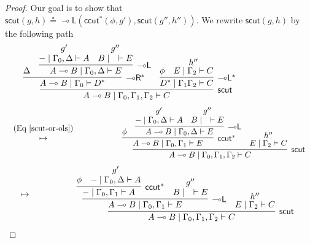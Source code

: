 \documentclass[sn-mathphys-num]{sn-jnl}%
\newcommand{\GG}{\Gamma}
\newcommand{\GD}{\Delta}
\newcommand{\vd}{\vdash}
\newcommand{\lolli}{\multimap}
\newcommand{\lleft}{{\lolli}\mathsf{L}}
\newcommand{\lright}{{\lolli}\mathsf{R}}
\newcommand{\mf}[1]{\mathsf{#1}}
\newcommand{\scut}[2]{\mf{scut} (#1 , #2)}
\newcommand{\iccut}[2]{\mf{ccut}^* (#1 , #2)}
\theoremstyle{thmstyleone}%
\theoremstyle{thmstyletwo}%
\theoremstyle{thmstylethree}%
\begin{document}
\begin{proof}
Our goal is to show that $\scut{g}{h} \circeq \lleft(\iccut{\phi}{g'} , \scut{g''}{h''})$.
We rewrite $\scut{g}{h}$ by the following path
\begin{displaymath}
  \begin{array}{lr}
  \begin{array}{c}
    \infer[\mf{scut}]{A \lolli B \mid \GG_0 , \GG_1 , \GG_2 \vd C}{
      \infer[\lright^*]{A\lolli B \mid \GG_0 \vd D^*}{
        \GD
        &
        \infer[\lleft]{A \lolli B \mid \GG_0 , \GD \vd E}{
          \deduce{{-} \mid \GG_0 , \GD \vd A}{g'}
          &
          \deduce{B \mid \quad \vd E}{g''}
        }
      }
      &
      \infer[\lleft^*]{D^* \mid \GG_1 \GG_2 \vd C}{
            \phi
            &
            \deduce{E \mid \GG_2 \vd C}{h''}
          }
    }
  \end{array}
    &
    \qquad
    \qquad
    \qquad
  \end{array}
\end{displaymath}
\begin{displaymath}
  \begin{array}{lr}
    \begin{array}{c}
    (\text{Eq} \ \ref{scut-or-ols})
    \\
    \mapsto
  \end{array}
  \qquad
  \qquad
  &
  \begin{array}{c}
    \infer[\mf{scut}]{A \lolli B \mid \GG_0 , \GG_1 , \GG_2 \vd C}{
    \infer[\mf{ccut}^*]{A \lolli B \mid \GG_0 , \GG_1 \vd E}{
      \phi
      &
      \infer[\lleft]{A \lolli B \mid \GG_0 , \GD \vd E}{
        \deduce{{-} \mid \GG_0 , \GD \vd A}{g'}
        &
        \deduce{B \mid \quad \vd E}{g''}
      }
    }
    &
    \deduce{E \mid \GG_2 \vd C}{h''}
  }
  \end{array}
  \end{array}
\end{displaymath}
\begin{displaymath}
  \begin{array}{lr}
    \mapsto&
    \qquad \qquad
    \begin{array}{c}
      \infer[\mf{scut}]{A \lolli B \mid \GG_0 , \GG_1 , \GG_2 \vd C}{
      \infer[\lleft]{A \lolli B \mid \GG_0 , \GG_1 \vd E}{
        \infer[\mf{ccut}^*]{{-} \mid \GG_0 , \GG_1 \vd A}{
          \phi
          &
          \deduce{{-} \mid \GG_0 , \GD \vd A}{g'}
        }
        &
        \deduce{B \mid \quad \vd E}{g''}
      }
      &
      \deduce{E \mid \GG_2 \vd C}{h''}
    }
    \end{array}

\end{array}
\end{displaymath}
\end{proof}
\end{document}
